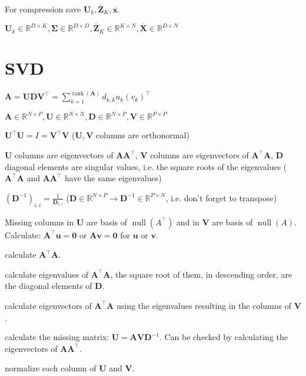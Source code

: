 \documentclass[a4paper, 11pt, landscape]{article}
\begin{document}
\begin{multicols*}{3}
\begin{compactitem}
	\item For compression save $\mathbf{U}_k, \overline{\mathbf{Z}}_K, \overline{\mathbf{x}}$.
	\item $\mathbf{U}_k \in \mathbb{R}^{D \times K}, \boldsymbol{\Sigma} \in \mathbb{R}^{D \times D}, \overline{\mathbf{Z}}_K \in \mathbb{R}^{K \times N}, \overline{\mathbf{X}} \in \mathbb{R}^{D \times N}$
\end{compactitem}

\section{SVD}
\begin{inparaitem}[\color{red}\textbullet]
	\item $\mathbf{A} = \mathbf{U} \mathbf{D} \mathbf{V}^\top = \sum_{k=1}^{\operatorname{rank}(\mathbf{A})} d_{k,k} u_k (v_k)^\top$
	\item $\mathbf{A} \in \mathbb{R}^{N \times P}, \mathbf{U} \in \mathbb{R}^{N \times N}, \mathbf{D} \in \mathbb{R}^{N \times P}, \mathbf{V} \in \mathbb{R}^{P \times P}$
	\item $\mathbf{U}^\top \mathbf{U} = I = \mathbf{V}^\top \mathbf{V}$ ($\mathbf{U}, \mathbf{V}$ columns are orthonormal)
	\item $\mathbf{U}$ columns are eigenvectors of $\mathbf{A} \mathbf{A}^\top$, $\mathbf{V}$ columns are eigenvectors of $\mathbf{A}^\top \mathbf{A}$, $\mathbf{D}$ diagonal elements are singular values, i.e. the square roots of the eigenvalues ($\mathbf{A}^\top \mathbf{A}$ and $\mathbf{A} \mathbf{A}^\top$ have the same eigenvalues)
	\item $(\mathbf{D}^{-1})_{i,i} = \frac{1}{\mathbf{D}_{i, i}}$ ($\mathbf{D} \in \mathbb{R}^{N \times P} \to \mathbf{D}^{-1} \in \mathbb{R}^{P \times N}$, i.e. don't forget to transpose)
	\item Missing columns in $\mathbf{U}$ are basis of $\operatorname{null}(A^\top)$ and in $\mathbf{V}$ are basis of $\operatorname{null}(A)$. Calculate: $\mathbf{A}^\top \mathbf{u} = \mathbf{0}$ or $\mathbf{A} \mathbf{v} = \mathbf{0}$ for $\mathbf{u}$ or $\mathbf{v}$.
\end{inparaitem}

\begin{inparaenum}
	\item calculate $\mathbf{A}^\top \mathbf{A}$.
	\item calculate eigenvalues of $\mathbf{A}^\top \mathbf{A}$, the square root of them, in descending order, are the diagonal elements of $\mathbf{D}$.
	\item calculate eigenvectors of $\mathbf{A}^\top \mathbf{A}$ using the eigenvalues resulting in the columns of $\mathbf{V}$.
	\item calculate the missing matrix: $\mathbf{U} = \mathbf{A} \mathbf{V} \mathbf{D}^{-1}$. Can be checked by calculating the eigenvectors of $\mathbf{A} \mathbf{A}^\top$.
	\item normalize each column of $\mathbf{U}$ and $\mathbf{V}$.
\end{inparaenum}


\end{multicols*}
\end{document}

